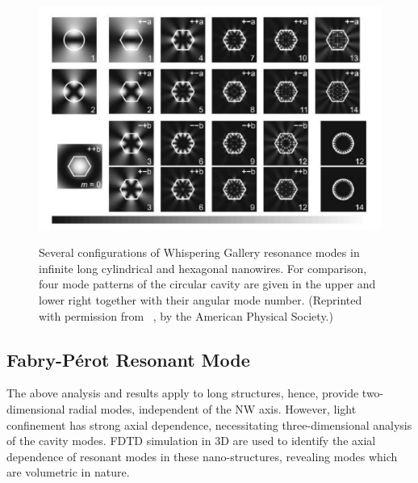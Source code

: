 \begin{figure}
  \caption[Several configuration of Whispering Gallery resonance modes in infinite long cylindrical and hexagonal nanowires.]{Several configurations of Whispering Gallery resonance modes in infinite long cylindrical and hexagonal nanowires. For comparison, four mode patterns of the circular cavity are given in the upper and lower right together with their angular mode number. (Reprinted with permission from~\cite{Nobis:2005wg} ,  by the American Physical Society.)}
  \centering
  \includegraphics[width=\textwidth]{pictures/LM/WGMode}
  \label{WGMode}
\end{figure}

\subsection{Fabry-P{\'e}rot Resonant Mode}

The above analysis and results apply to long structures, hence, provide
two-dimensional radial modes, independent of the NW axis. However, light
confinement has strong axial dependence, necessitating three-dimensional
analysis of the cavity modes. FDTD simulation in 3D are used to identify the
axial dependence of resonant modes in these nano-structures, revealing modes
which are volumetric in nature.


